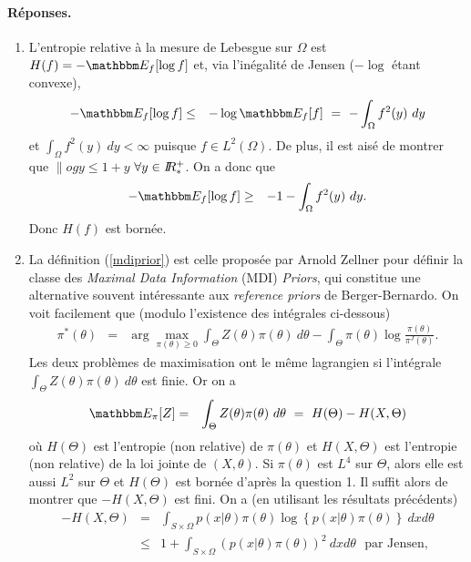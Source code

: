 \paragraph{\bf Réponses.}
\begin{enumerate}
\item L'entropie relative à la mesure de Lebesgue sur $\Omega$ est $H(f)=-\E_f[\log f] $ et, via l'inégalité de Jensen ($-\log $ étant convexe), 
\begin{eqnarray*}
-\E_f[\log f] & \leq & -\log \E_f[ f] \ = \ -\int_{\Omega} f^2(y) \ dy
\end{eqnarray*}
et $\int_{\Omega} f^2(y) \ dy < \infty$ puisque  $f\in L^2(\Omega)$. De plus, il est aisé de montrer que  $\|og y \leq 1 + y$ $\forall y\in I\!\!R^+_*$. On a donc que
\begin{eqnarray*}
-\E_f[\log f]  & \geq & -1 - \int_{\Omega} f^2(y) \ dy.
\end{eqnarray*}
Donc $H(f)$ est bornée. 
\item La définition (\ref{mdiprior}) est celle proposée par Arnold Zellner pour définir la classe des {\it Maximal Data Information} (MDI) {\it Priors}, qui constitue une alternative souvent intéressante aux {\it reference priors} de Berger-Bernardo. On voit facilement que (modulo l'existence des intégrales ci-dessous) 
 \begin{eqnarray*}
\pi^*(\theta) & = & \arg\max\limits_{\pi(\theta)\geq 0}  \int_{\Theta} Z(\theta) \pi(\theta) \ d\theta - \int_{\Theta}
\pi(\theta) \log \frac{\pi(\theta)}{\pi^J(\theta)}. 
\end{eqnarray*}
Les deux problèmes de maximisation ont le même lagrangien si l'intégrale $\int_{\Theta} Z(\theta) \pi(\theta) \ d\theta $ est finie. Or on a
\begin{eqnarray*}
\E_{\pi}[Z] & = & \int_{\Theta} Z(\theta) \pi(\theta) \ d \theta \ = \ H(\Theta) - H(X,\Theta)
\end{eqnarray*}
où $H(\Theta)$ est l'entropie (non relative) de $\pi(\theta)$ et  $H(X,\Theta)$ est l'entropie (non relative) de la loi jointe de $(X,\theta)$. Si $\pi(\theta)$ est $L^4$ sur $\Theta$, alors elle est aussi $L^2$ sur $\Theta$ et  $H(\Theta)$ est bornée d'après la question 1. Il suffit alors de montrer que $- H(X,\Theta)$ est fini. On a (en utilisant les résultats précédents)
\begin{eqnarray*}
- H(X,\Theta) & = & \int_{S \times \Omega} p(x|\theta) \pi(\theta) \log \left\{ p(x|\theta) \pi(\theta) \right\} \ dx d\theta \\
& \leq & 1 + \int_{S \times \Omega} \left(p(x|\theta) \pi(\theta)\right)^2  \ dx d\theta \ \ \ \text{par Jensen}, \\

\end{eqnarray*}
\end{enumerate}
